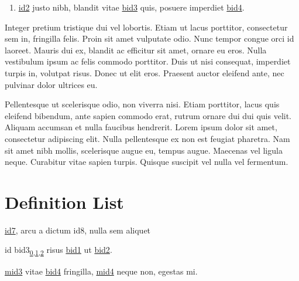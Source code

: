 \begin{enumerate}
\begin{itemize}
\end{itemize}

\item {} 
\sphinxAtStartPar
\hyperlink{\detokenize{id2}}{id2} justo nibh, blandit vitae \hyperlink{\detokenize{bid3}}{\hypertarget{\detokenize{bid3-ref17}}{bid3}} quis, posuere
imperdiet \hyperlink{\detokenize{bid4}}{\hypertarget{\detokenize{bid4-ref18}}{bid4}}.

\end{enumerate}

\sphinxAtStartPar
Integer pretium tristique dui vel lobortis. Etiam ut lacus porttitor, consectetur sem in, fringilla
felis. Proin sit amet vulputate odio. Nunc tempor congue orci id laoreet. Mauris dui ex, blandit ac
efficitur sit amet, ornare eu eros. Nulla vestibulum ipsum ac felis commodo porttitor. Duis ut nisi
consequat, imperdiet turpis in, volutpat risus. Donec ut elit eros. Praesent auctor eleifend ante,
nec pulvinar dolor ultrices eu.

\sphinxAtStartPar
Pellentesque ut scelerisque odio, non viverra nisi. Etiam porttitor, lacus quis eleifend bibendum,
ante sapien commodo erat, rutrum ornare dui dui quis velit. Aliquam accumsan et nulla faucibus
hendrerit. Lorem ipsum dolor sit amet, consectetur adipiscing elit. Nulla pellentesque ex non est
feugiat pharetra. Nam sit amet nibh mollis, scelerisque augue eu, tempus augue. Maecenas vel ligula
neque. Curabitur vitae sapien turpis. Quisque suscipit vel nulla vel fermentum.


\section{Definition List}
\label{\detokenize{test:definition-list}}\begin{description}
\sphinxAtStartPar
\hyperlink{\detokenize{id7}}{id7}, arcu a dictum \hypertarget{\detokenize{id8}}{id8}, nulla sem aliquet

\sphinxAtStartPar
id \hypertarget{\detokenize{bid3}}{bid3}\texorpdfstring{\textsubscript{\hyperlink{\detokenize{bid3-ref7}}{0},\hyperlink{\detokenize{bid3-ref17}}{1},\hyperlink{\detokenize{bid3-ref30}}{2}}}{} risus \hyperlink{\detokenize{bid1}}{\hypertarget{\detokenize{bid1-ref20}}{bid1}} ut \hyperlink{\detokenize{bid2}}{\hypertarget{\detokenize{bid2-ref21}}{bid2}}.

\sphinxAtStartPar
\hyperlink{\detokenize{test-mid3-id0}}{\hypertarget{\detokenize{test-mid3-id1}}{mid3}} vitae \hyperlink{\detokenize{bid4}}{\hypertarget{\detokenize{bid4-ref22}}{bid4}} fringilla, \hyperlink{\detokenize{test-mid4-id0}}{\hypertarget{\detokenize{test-mid4-id1}}{mid4}} neque non, egestas mi.

\end{description}

